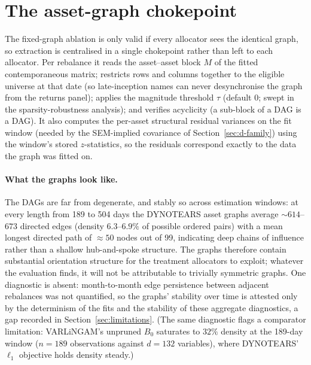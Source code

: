 \section{The asset-graph chokepoint}
\label{sec:asset-graph}

The fixed-graph ablation is only valid if every allocator sees the
identical graph, so extraction is centralised in a single
chokepoint rather than left to each allocator. Per rebalance it reads the
asset--asset block $M$ of the fitted contemporaneous matrix; restricts rows
and columns together to the eligible universe at that date (so
late-inception names can never desynchronise the graph from the returns
panel); applies the magnitude threshold $\tau$ (default $0$; swept in the
sparsity-robustness analysis); and verifies acyclicity (a sub-block of a DAG
is a DAG). It also computes the per-asset structural residual variances on
the fit window (needed by the SEM-implied covariance of
Section~\ref{sec:d-family}) using the window's stored $z$-statistics, so
the residuals correspond exactly to the data the graph was fitted on.

\paragraph{What the graphs look like.} The DAGs are far from degenerate,
and stably so across estimation windows: at every length from 189 to 504
days the DYNOTEARS asset graphs average ${\sim}614$--$673$ directed edges
(density $6.3$--$6.9\%$ of possible ordered pairs) with a mean longest
directed
path of ${\approx}50$ nodes out of 99, indicating deep chains of influence
rather than a shallow hub-and-spoke structure. The graphs therefore contain
substantial orientation structure for the treatment allocators to exploit;
whatever the evaluation finds, it will not be attributable to trivially
symmetric graphs. One diagnostic is absent: month-to-month edge
persistence between adjacent rebalances was not quantified, so the graphs'
stability over time is attested only by the determinism of the fits and
the stability of these aggregate diagnostics, a gap recorded in
Section~\ref{sec:limitations}. (The
same diagnostic flags a comparator limitation: VARLiNGAM's unpruned $B_0$
saturates to $32\%$ density at the 189-day window ($n=189$ observations
against $d=132$ variables), where DYNOTEARS' $\ell_1$ objective holds
density steady.)

